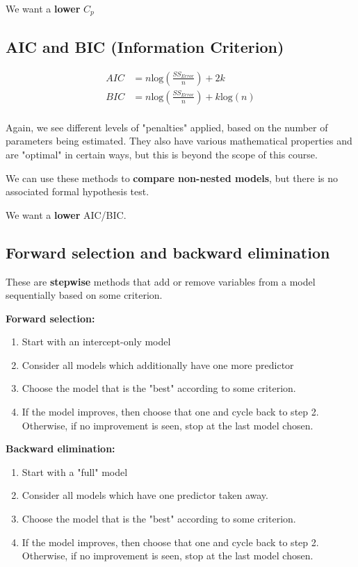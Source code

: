 \documentclass[titlepage, 12pt, leqno]{article}
\begin{document}
\begin{note}
    We want a \textbf{lower} $C_p$
\end{note}

\subsection{AIC and BIC (Information Criterion)}
\begin{align*}
    AIC &= n \text{log}\left(\frac{SS_{Error}}{n}\right) + 2k \\
        BIC &= n \text{log}\left(\frac{SS_{Error}}{n}\right) + k \text{log}(n) \\
\end{align*}

Again, we see different levels of "penalties" applied, based on the number of 
parameters being estimated. They also have various mathematical properties and
are "optimal" in certain ways, but this is beyond the scope of this course.

We can use these methods to \textbf{compare non-nested models}, but there is no
associated formal hypothesis test.

\begin{note}
    We want a \textbf{lower} AIC/BIC.
\end{note}

\subsection{Forward selection and backward elimination}
These are \textbf{stepwise} methods that add or remove variables from a model
sequentially based on some criterion.

\textbf{Forward selection:}
\begin{enumerate}
    \item Start with an intercept-only model
    \item Consider all models which additionally have one more predictor
    \item Choose the model that is the "best" according to some criterion.
    \item If the model improves, then choose that one and cycle back to step 2.
        Otherwise, if no improvement is seen, stop at the last model chosen.
\end{enumerate}

\textbf{Backward elimination:}
\begin{enumerate}
    \item Start with a "full" model
    \item Consider all models which have one predictor taken away.
    \item Choose the model that is the "best" according to some criterion.
    \item If the model improves, then choose that one and cycle back to step 2.
        Otherwise, if no improvement is seen, stop at the last model chosen.
\end{enumerate}
\end{document}
